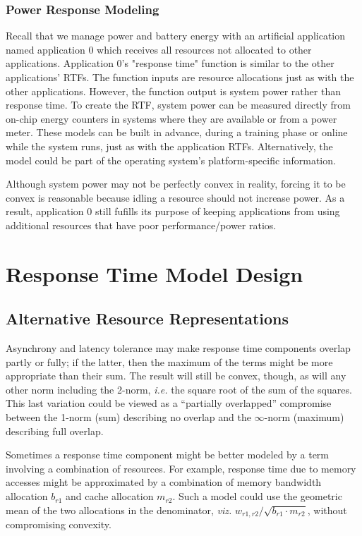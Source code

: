 \subsubsection*{Power Response Modeling}
Recall that we manage power and battery energy with an artificial application named application 0 which receives all resources not allocated to other applications. Application 0's "response time" function is similar to the other applications' RTFs.  The function inputs are resource allocations just as with the other applications.  However, the function output is system power rather than response time.   To create the RTF, system power can be measured directly from on-chip energy counters in systems where they are available or from a power meter.  These models can be built in advance, during a training phase or online while the system runs, just as with the application RTFs.  Alternatively, the model could be part of the operating system's platform-specific information.

Although system power may not be perfectly convex in reality, forcing it to be convex is reasonable because idling a resource should not increase power.  As a result, application 0 still fufills its purpose of keeping applications from using additional resources that have poor performance/power ratios.

\section{Response Time Model Design}\label{rtf_choice}

\subsection*{Alternative Resource Representations}
Asynchrony and latency tolerance may make response time components overlap partly or fully;
if the latter, then the maximum of the terms might be more appropriate than their sum.
The result will still be convex, though, as will any other norm including the 2-norm,
\emph{i.e.} the square root of the sum of the squares.
This last variation could be viewed as a ``partially overlapped'' compromise between
the 1-norm (sum) describing no overlap and the $\infty$-norm (maximum) describing full overlap.

Sometimes a response time component might be better modeled by a term involving a combination of resources.
For example, response time due to memory accesses might be approximated
by a combination of memory bandwidth allocation $b_{r1}$ and cache allocation $m_{r2}$.
Such a model could use the geometric mean of the two allocations in the denominator,
\emph{viz.} $w_{r1,r2}/\sqrt{b_{r1}\cdot m_{r2}}$, without compromising convexity.

